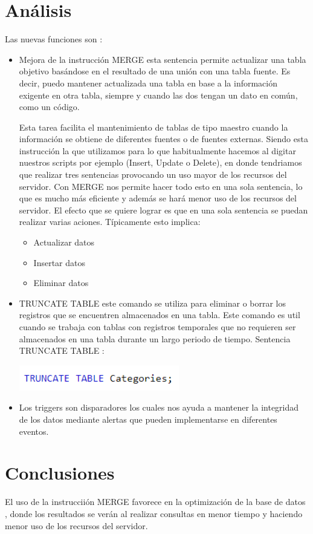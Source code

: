 \documentclass[twoside,twocolumn]{article}
\begin{document}
\section{Análisis}
Las nuevas funciones son :
\begin{itemize}
\item Mejora de la instrucción MERGE esta sentencia permite actualizar una tabla objetivo basándose en el resultado de una unión con una tabla fuente. Es decir, puedo mantener actualizada una tabla en base a la información exigente en otra tabla, siempre y cuando las dos tengan un dato en común, como un código.

Esta tarea facilita el mantenimiento de tablas de tipo maestro cuando la información se obtiene de diferentes fuentes o de fuentes externas. Siendo esta instrucción la que utilizamos para lo que habitualmente hacemos al digitar nuestros scripts por ejemplo (Insert, Update o Delete), en donde tendriamos que realizar tres sentencias provocando un uso mayor de los recursos del servidor. Con MERGE nos permite hacer todo esto en una sola sentencia, lo que es mucho más eficiente y además se hará menor uso de los recursos del servidor.
El efecto que se quiere lograr es que en una sola sentencia se puedan realizar varias aciones. Típicamente esto implica:
\begin{itemize}
\item Actualizar datos
\item Insertar datos
\item Eliminar datos
\end{itemize}
\item TRUNCATE TABLE este comando se utiliza para eliminar o borrar los registros que se encuentren almacenados en una tabla. Este comando es util cuando se trabaja con tablas con registros temporales que no requieren ser almacenados en una tabla durante un largo periodo de tiempo.
Sentencia TRUNCATE TABLE :

\begin{center}
\includegraphics[width=7cm]{./Imagenes/01} 
\end{center}
\item Los triggers son disparadores los cuales nos ayuda a mantener la integridad de los datos mediante alertas que pueden implementarse en diferentes eventos.
\end{itemize}
\section{Conclusiones}
El uso de la instrucciión MERGE favorece en la optimización de la base de datos , donde los resultados se verán al realizar consultas en menor tiempo y haciendo menor uso de los recursos del servidor.
\end{document}
